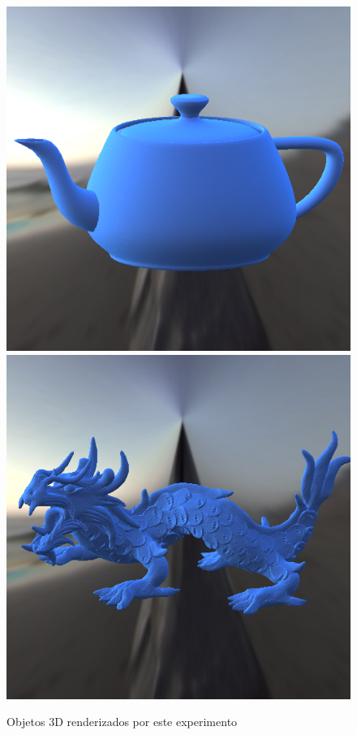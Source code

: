 \begin{figure}[H]
    \caption{\small{Objetos 3D renderizados por este experimento}}\label{fig-ashikhmin-shirley-alternative-eqlang}
  \includegraphics[width=\linewidth]{./Imagens/brdfs/ashikhmin-shirley-alternative-teapot.png}
\endminipage\hfill
{}
  \includegraphics[width=\linewidth]{./Imagens/brdfs/ashikhmin-shirley-alternative-dragon.png}

\end{figure}
